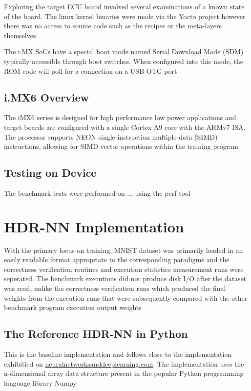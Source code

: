 Exploring the target ECU board involved several examinations of a known state of the board. The linux kernel binaries were made via the Yocto project however there was no access to source code such as the recipes or the meta-layers themselves

The i.MX SoCs have a special boot mode named Serial Download Mode (SDM) typically accessible through boot switches. When configured into this mode, the ROM code will poll for a connection on a USB OTG port

\subsection[ECU / iMX6 Evaluation Board Overview]{i.MX6 Overview}

The iMX6 series is designed for high performance low power applications and target boards are configured with a single Cortex A9 core with the ARMv7 ISA. The processor supports NEON single-instruction multiple-data (SIMD) instructions, allowing for SIMD vector operations within the training program

\subsection{Testing on Device}

The benchmark tests were performed on ... using the perf tool

\section{HDR-NN Implementation}

With the primary focus on training, MNIST dataset was primarily loaded in an easily readable format appropriate to the corresponding paradigms and the correctness verification routines and execution statistics measurement runs were seperated. The benchmark executions did not produce disk I/O after the dataset was read, unlike the correctness verification runs which produced the final weights from the execution runs that were subsequently compared with the other benchmark program execution output weights

\subsection[Python - Numpy]{The Reference HDR-NN in Python}

This is the baseline implementation and follows close to the implementation exhibitied on \href{http://neuralnetworksanddeeplearning.com}{neuralnetworksanddeeplearning.com}. The implementation uses the n-dimensional array data structure present in the popular Python programming language library Numpy

